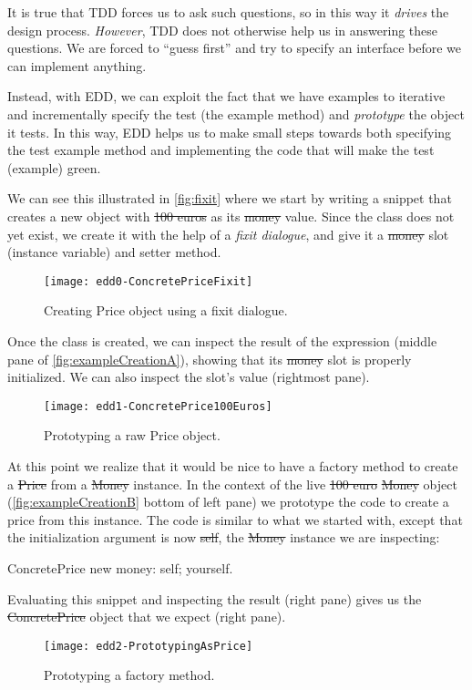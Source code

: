 \documentclass[acmsmall,screen,authorversion,nonacm]{acmart} %
\begin{document}
It is true that TDD forces us to ask such questions, so in this way it \emph{drives} the design process.
\emph{However}, TDD does not otherwise help us in answering these questions.
We are forced to ``guess first'' and try to specify an interface before we can implement anything.

Instead, with EDD, we can exploit the fact that we have examples to iterative and incrementally specify the test (\ie the example method) and \emph{prototype} the object it tests.
In this way, EDD helps us to make small steps towards both specifying the test example method and implementing the code that will make the test (example) green.

We can see this illustrated in \autoref{fig:fixit} where we start by writing a snippet that creates a new  object with \st{100 euros} as its \st{money} value.
Since the class does not yet exist, we create it with the help of a \emph{fixit dialogue}, and give it a \st{money} slot (instance variable) and setter method.
\begin{figure}[h]
  \texttt{[image: edd0-ConcretePriceFixit]}
	\caption{Creating Price object using a fixit dialogue.}
  \label{fig:fixit}
\end{figure}

Once the class is created, we can inspect the result of the expression (middle pane of \autoref{fig:exampleCreationA}), showing that its \st{money} slot is properly initialized.
We can also inspect the slot's value (rightmost pane).

\begin{figure}[h]
  \texttt{[image: edd1-ConcretePrice100Euros]}
	\caption{Prototyping a raw Price object.}
  \label{fig:exampleCreationA}
\end{figure}

At this point we realize that it would be nice to have a factory method to create a \st{Price} from a \st{Money} instance.
In the context of the live \st{100 euro} \st{Money} object (\autoref{fig:exampleCreationB} bottom of left pane) we prototype the code to create a price from this instance.
The code is similar to what we started with, except that the initialization argument is now \st{self}, the \st{Money} instance we are inspecting:
\begin{code}
ConcretePrice new money: self; yourself.
\end{code}
Evaluating this snippet and inspecting the result (right pane) gives us the \st{ConcretePrice} object that we expect (right pane).
\begin{figure}[h]
  \texttt{[image: edd2-PrototypingAsPrice]}
	\caption{Prototyping a factory method.}
  \label{fig:exampleCreationB}
\end{figure}
\end{document}
